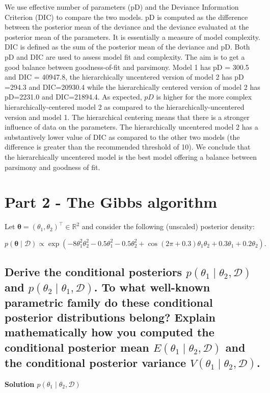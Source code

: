 \documentclass[12pt]{article}
\begin{document}
We use effective number of parameters (pD) and the Deviance Information Criterion (DIC) to compare the two models. pD is computed as the difference between the posterior mean of the deviance and the deviance evaluated at the posterior mean of the parameters. It is essentially a measure of model complexity. DIC is defined as the sum of the posterior mean of the deviance and pD. Both pD and DIC are used to assess model fit and complexity. The aim is to get a good balance between goodness-of-fit and parsimony. 
Model 1 has pD = 300.5 and DIC = 40947.8, the hierarchically uncentered version of model 2 has pD =294.3 and DIC=20930.4 while the hierarchically centered version of model 2 has pD=2231.0 and DIC=21894.4. As expected, $pD$ is higher for the more complex hierarchically-centered model 2 as compared to the hierarchically-uncentered version and model 1. The hierarchical centering means that there is a stronger influence of data on the parameters. The hierarchically uncentered model 2 has a substantively lower value of DIC as compared to the other two models (the difference is greater than the recommended threshold of 10). We conclude that the hierarchically uncentered model is the best model offering a balance between parsimony and goodness of fit.  




\newpage
\section{Part 2 - The Gibbs algorithm}
Let \(\boldsymbol{\theta} = (\theta_1, \theta_2)^\top \in \mathbb{R}^2\) and consider the following (unscaled) posterior density:

\[
p(\boldsymbol{\theta} \mid \mathcal{D}) \propto \exp\left(-8\theta_1^2\theta_2^2 - 0.5\theta_1^2 - 0.5\theta_2^2 + \cos(2\pi + 0.3)\theta_1\theta_2 + 0.3\theta_1 + 0.2\theta_2 \right).
\]

\subsection{Derive the conditional posteriors \(p(\theta_1 \mid \theta_2, \mathcal{D})\) and \(p(\theta_2 \mid \theta_1, \mathcal{D})\). To what well-known parametric family do these conditional posterior distributions belong? Explain mathematically how you computed the conditional posterior mean \(E(\theta_1 \mid \theta_2, \mathcal{D})\) and the conditional posterior variance \(V(\theta_1 \mid \theta_2, \mathcal{D})\).} 
\textbf{Solution \(p(\theta_1 \mid \theta_2, \mathcal{D})\) }{\label{theta1}}
\end{document}
